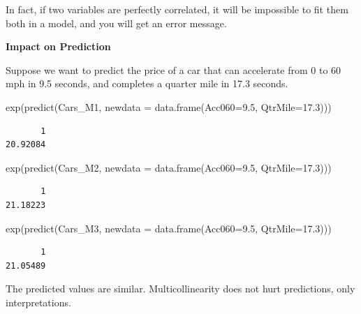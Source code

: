 \documentclass[
  letterpaper,
  DIV=11,
  numbers=noendperiod]{scrreprt}
\newenvironment{Shaded}{\begin{snugshade}}{\end{snugshade}}
\newcommand{\AttributeTok}[1]{\textcolor[rgb]{0.40,0.45,0.13}{#1}}
\newcommand{\FloatTok}[1]{\textcolor[rgb]{0.68,0.00,0.00}{#1}}
\newcommand{\FunctionTok}[1]{\textcolor[rgb]{0.28,0.35,0.67}{#1}}
\newcommand{\NormalTok}[1]{\textcolor[rgb]{0.00,0.23,0.31}{#1}}
\begin{document}
In fact, if two variables are perfectly correlated, it will be
impossible to fit them both in a model, and you will get an error
message.

\textbf{Impact on Prediction}

Suppose we want to predict the price of a car that can accelerate from 0
to 60 mph in 9.5 seconds, and completes a quarter mile in 17.3 seconds.

\begin{Shaded}
\begin{Highlighting}[]
\FunctionTok{exp}\NormalTok{(}\FunctionTok{predict}\NormalTok{(Cars\_M1, }\AttributeTok{newdata =} \FunctionTok{data.frame}\NormalTok{(}\AttributeTok{Acc060=}\FloatTok{9.5}\NormalTok{, }\AttributeTok{QtrMile=}\FloatTok{17.3}\NormalTok{)))}
\end{Highlighting}
\end{Shaded}

\begin{verbatim}
       1 
20.92084 
\end{verbatim}

\begin{Shaded}
\begin{Highlighting}[]
\FunctionTok{exp}\NormalTok{(}\FunctionTok{predict}\NormalTok{(Cars\_M2, }\AttributeTok{newdata =} \FunctionTok{data.frame}\NormalTok{(}\AttributeTok{Acc060=}\FloatTok{9.5}\NormalTok{, }\AttributeTok{QtrMile=}\FloatTok{17.3}\NormalTok{)))}
\end{Highlighting}
\end{Shaded}

\begin{verbatim}
       1 
21.18223 
\end{verbatim}

\begin{Shaded}
\begin{Highlighting}[]
\FunctionTok{exp}\NormalTok{(}\FunctionTok{predict}\NormalTok{(Cars\_M3, }\AttributeTok{newdata =} \FunctionTok{data.frame}\NormalTok{(}\AttributeTok{Acc060=}\FloatTok{9.5}\NormalTok{, }\AttributeTok{QtrMile=}\FloatTok{17.3}\NormalTok{)))}
\end{Highlighting}
\end{Shaded}

\begin{verbatim}
       1 
21.05489 
\end{verbatim}

The predicted values are similar. Multicollinearity does not hurt
predictions, only interpretations.
\end{document}
